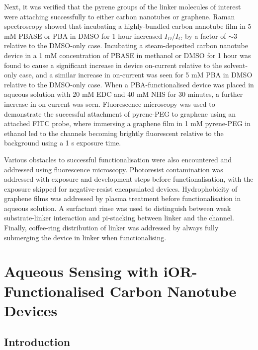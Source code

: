 \documentclass[
  a4paper,
]{scrbook}
\begin{document}
Next, it was verified that the pyrene groups of the linker molecules of
interest were attaching successfully to either carbon nanotubes or
graphene. Raman spectroscopy showed that incubating a highly-bundled
carbon nanotube film in 5 mM PBASE or PBA in DMSO for 1 hour increased
\(I_D/I_G\) by a factor of \(\sim 3\) relative to the DMSO-only case.
Incubating a steam-deposited carbon nanotube device in a 1 mM
concentration of PBASE in methanol or DMSO for 1 hour was found to cause
a significant increase in device on-current relative to the solvent-only
case, and a similar increase in on-current was seen for 5 mM PBA in DMSO
relative to the DMSO-only case. When a PBA-functionalised device was
placed in aqueous solution with 20 mM EDC and 40 mM NHS for 30 minutes,
a further increase in on-current was seen. Fluorescence microscopy was
used to demonstrate the successful attachment of pyrene-PEG to graphene
using an attached FITC probe, where immersing a graphene film in 1 mM
pyrene-PEG in ethanol led to the channels becoming brightly fluorescent
relative to the background using a 1 s exposure time.

Various obstacles to successful functionalisation were also encountered
and addressed using fluorescence microscopy. Photoresist contamination
was addressed with exposure and development steps before
functionalisation, with the exposure skipped for negative-resist
encapsulated devices. Hydrophobicity of graphene films was addressed by
plasma treatment before functionalisation in aqueous solution. A
surfactant rinse was used to distinguish between weak substrate-linker
interaction and pi-stacking between linker and the channel. Finally,
coffee-ring distribution of linker was addressed by always fully
submerging the device in linker when functionalising.


\hypertarget{sec-biosensing-iORs}{%
\chapter{Aqueous Sensing with iOR-Functionalised Carbon Nanotube
Devices}\label{sec-biosensing-iORs}}

\hypertarget{introduction-5}{%
\section{Introduction}\label{introduction-5}}
\end{document}
